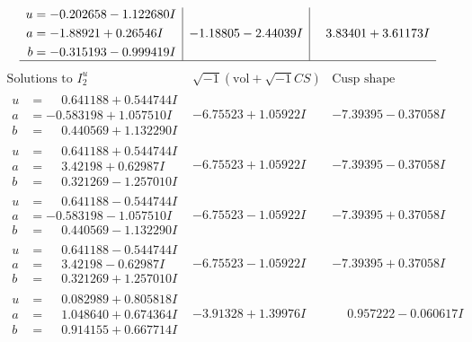 \documentclass[1p]{elsarticle_modified}
\theoremstyle{definition}
\newcommand{\I}{\sqrt{-1}}
\begin{document}
$$\begin{array}{c|c|c}
\begin{aligned}
u &= -0.202658 - 1.122680 I \\
a &= -1.88921 + 0.26546 I \\
b &= -0.315193 - 0.999419 I\end{aligned}
 & -1.18805 - 2.44039 I & \phantom{-}3.83401 + 3.61173 I\\
 \hline 
 \end{array}$$\newpage$$\begin{array}{c|c|c}  
\text{Solutions to }I^u_{2}& \I (\text{vol} + \sqrt{-1}CS) & \text{Cusp shape}\\
 \hline 
\begin{aligned}
u &= \phantom{-}0.641188 + 0.544744 I \\
a &= -0.583198 + 1.057510 I \\
b &= \phantom{-}0.440569 + 1.132290 I\end{aligned}
 & -6.75523 + 1.05922 I & -7.39395 - 0.37058 I \\ \hline\begin{aligned}
u &= \phantom{-}0.641188 + 0.544744 I \\
a &= \phantom{-}3.42198 + 0.62987 I \\
b &= \phantom{-}0.321269 - 1.257010 I\end{aligned}
 & -6.75523 + 1.05922 I & -7.39395 - 0.37058 I \\ \hline\begin{aligned}
u &= \phantom{-}0.641188 - 0.544744 I \\
a &= -0.583198 - 1.057510 I \\
b &= \phantom{-}0.440569 - 1.132290 I\end{aligned}
 & -6.75523 - 1.05922 I & -7.39395 + 0.37058 I \\ \hline\begin{aligned}
u &= \phantom{-}0.641188 - 0.544744 I \\
a &= \phantom{-}3.42198 - 0.62987 I \\
b &= \phantom{-}0.321269 + 1.257010 I\end{aligned}
 & -6.75523 - 1.05922 I & -7.39395 + 0.37058 I \\ \hline\begin{aligned}
u &= \phantom{-}0.082989 + 0.805818 I \\
a &= \phantom{-}1.048640 + 0.674364 I \\
b &= \phantom{-}0.914155 + 0.667714 I\end{aligned}
 & -3.91328 + 1.39976 I & \phantom{-}0.957222 - 0.060617 I \\ \hline\begin{aligned}

\end{aligned}
\end{array}$$
\end{document}
